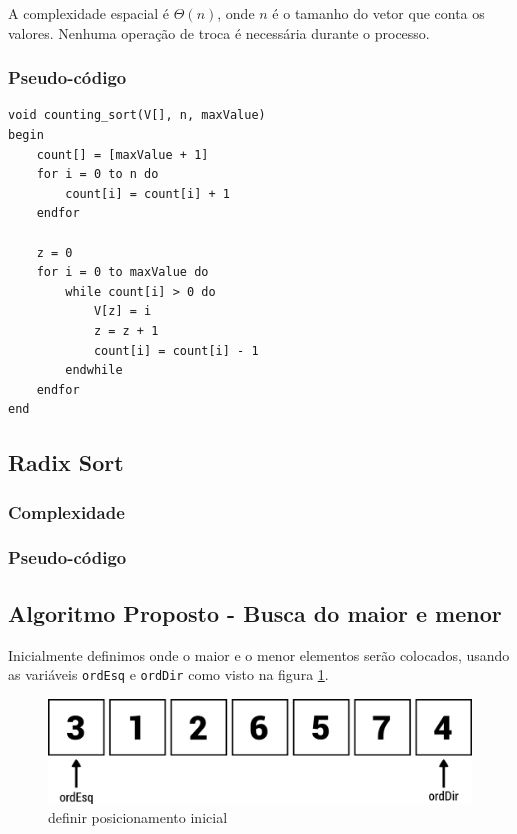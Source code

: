 A complexidade espacial é $\Theta(n)$, onde $n$ é o tamanho do vetor que
conta os valores. Nenhuma operação de troca é necessária durante o
processo.

\subsubsection{Pseudo-código}

\begin{verbatim}
void counting_sort(V[], n, maxValue)
begin
    count[] = [maxValue + 1]
    for i = 0 to n do
        count[i] = count[i] + 1
    endfor

    z = 0
    for i = 0 to maxValue do
        while count[i] > 0 do
            V[z] = i
            z = z + 1
            count[i] = count[i] - 1
        endwhile
    endfor
end
\end{verbatim}
\subsection{Radix Sort}

\subsubsection{Complexidade}

\subsubsection{Pseudo-código}

\subsection{Algoritmo Proposto - Busca do maior e menor}

Inicialmente definimos onde o maior e o menor elementos serão colocados,
usando as variáveis \texttt{ordEsq} e \texttt{ordDir} como visto na
figura \ref{fig:passo1}.

\begin{figure}[t]
   \includegraphics[scale=0.6]{img/maior.menor.algoritmo/passo1.png}
   \caption{definir posicionamento inicial}
   \label{fig:passo1}
\end{figure}

